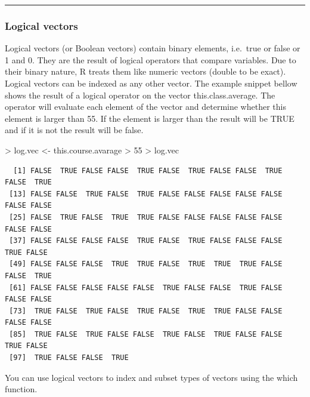 \documentclass[
]{book}
\newenvironment{Shaded}{\begin{snugshade}}{\end{snugshade}}
\newcommand{\DecValTok}[1]{\textcolor[rgb]{0.00,0.00,0.81}{#1}}
\newcommand{\NormalTok}[1]{#1}
\newcommand{\OtherTok}[1]{\textcolor[rgb]{0.56,0.35,0.01}{#1}}
\newcommand{\SpecialCharTok}[1]{\textcolor[rgb]{0.00,0.00,0.00}{#1}}
\theoremstyle{definition}
\theoremstyle{definition}
\theoremstyle{definition}
\theoremstyle{definition}
\theoremstyle{remark}
\begin{document}
\begin{center}\rule{0.5\linewidth}{0.5pt}\end{center}

\hypertarget{logical-vectors}{%
\subsubsection*{\texorpdfstring{\textbf{Logical vectors}}{Logical vectors}}\label{logical-vectors}}

Logical vectors (or Boolean vectors) contain binary elements, i.e.~true or false or 1 and 0.
They are the result of logical operators that compare variables. Due to their binary nature, R treats them like
numeric vectors (double to be exact). Logical vectors can be indexed as any other vector.
The example snippet bellow shows the result of a logical operator on the vector this.class.average.
The operator will evaluate each element of the vector and determine whether this element is larger than 55. If the
element is larger than the result will be TRUE and if it is not the result will be false.

\begin{Shaded}
\begin{Highlighting}[]
\SpecialCharTok{\textgreater{}}\NormalTok{ log.vec }\OtherTok{\textless{}{-}}\NormalTok{ this.course.avarage }\SpecialCharTok{\textgreater{}} \DecValTok{55}
\SpecialCharTok{\textgreater{}}\NormalTok{ log.vec}
\end{Highlighting}
\end{Shaded}

\begin{verbatim}
  [1] FALSE  TRUE FALSE FALSE  TRUE FALSE  TRUE FALSE FALSE  TRUE FALSE  TRUE
 [13] FALSE FALSE  TRUE FALSE  TRUE FALSE FALSE FALSE FALSE FALSE FALSE FALSE
 [25] FALSE  TRUE FALSE  TRUE  TRUE FALSE FALSE FALSE FALSE FALSE FALSE FALSE
 [37] FALSE FALSE FALSE FALSE  TRUE FALSE  TRUE FALSE FALSE FALSE  TRUE FALSE
 [49] FALSE FALSE FALSE  TRUE  TRUE FALSE  TRUE  TRUE  TRUE FALSE FALSE  TRUE
 [61] FALSE FALSE FALSE FALSE FALSE  TRUE FALSE FALSE  TRUE FALSE FALSE FALSE
 [73]  TRUE FALSE  TRUE FALSE  TRUE FALSE  TRUE  TRUE FALSE FALSE FALSE FALSE
 [85]  TRUE FALSE  TRUE FALSE FALSE  TRUE FALSE  TRUE FALSE FALSE  TRUE FALSE
 [97]  TRUE FALSE FALSE  TRUE
\end{verbatim}

You can use logical vectors to index and subset types of vectors using the which function.
\end{document}
